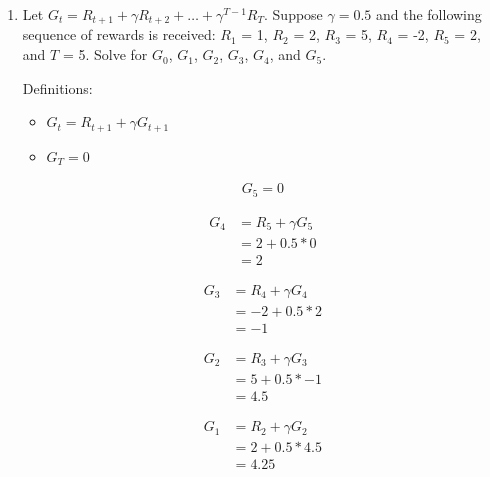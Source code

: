 \documentclass[11pt,onecolumn]{article}
\begin{document}
\begin{enumerate}
    \item Let $G_t = R_{t+1} + \gamma R_{t+2} + \ldots + \gamma^{T-1} R_{T}$. Suppose $\gamma = 0.5$ and the following sequence of rewards is received: $R_1$ = 1, $R_2$ = 2, $R_3$ = 5, $R_4$ = -2, $R_5$ = 2, and $T$ = 5. Solve for $G_0$, $G_1$, $G_2$, $G_3$, $G_4$, and $G_5$.
    \setlength{\parskip}{6pt}
    
    Definitions:
    \begin{itemize}
        \item $G_t = R_{t+1} + \gamma G_{t+1}$
        \item $G_T = 0$
    \end{itemize}
    \begin{equation}
        \begin{aligned}
            G_5 = 0
        \end{aligned}
    \end{equation}

    \begin{equation}
        \begin{aligned}
            G_4 & = R_{5} + \gamma G_{5} \\ 
            & = 2 + 0.5 * 0 \\
            & = 2
        \end{aligned}
    \end{equation}

    \begin{equation}
        \begin{aligned}
            G_3 & = R_{4} + \gamma G_{4} \\ 
            & = -2 + 0.5 * 2 \\
            & = -1
        \end{aligned}
    \end{equation}

    \begin{equation}
        \begin{aligned}
            G_2 & = R_{3} + \gamma G_{3} \\ 
            & = 5 + 0.5 * -1 \\
            & = 4.5
        \end{aligned}
    \end{equation}

    \begin{equation}
        \begin{aligned}
            G_1 & = R_{2} + \gamma G_{2} \\ 
            & = 2 + 0.5 * 4.5 \\
            & = 4.25
        \end{aligned}
    \end{equation}


\end{enumerate}
\end{document}
